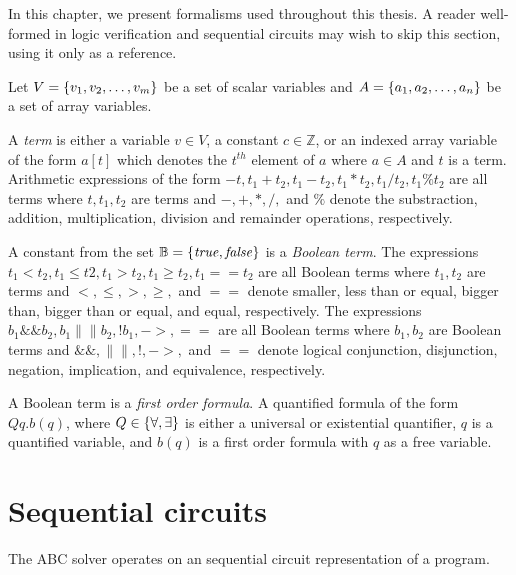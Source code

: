 In this chapter, we present formalisms used throughout this thesis. 
A reader well-formed in logic verification and sequential circuits may
wish to skip this section, using it only as a reference. 

Let $V=\{ v_1,v_2,\ldots,v_m \}$ be a set of scalar 
variables and $A=\{ a_1,a_2,\ldots,a_n \}$ be a set of 
array variables. 
\begin{definition}[terms] \label{def:term}
  \rm A {\em term} is either
  a variable $v\in V$,
 a constant $c\in \mathbb{Z}$, or 
 an indexed array variable of the form $a[t]$ 
 which denotes the $t^{th}$ element of $a$ where $a\in A$ and 
 $t$ is a term.
 Arithmetic expressions of the form 
 $-t, t_1+t_2, t_1-t_2, t_1*t_2, t_1/t_2, t_1\%t_2$ 
 are all terms where $t,t_1,t_2$ are terms and 
 $-,+,*,/,$ and $\%$ denote the substraction, 
 addition, multiplication, division and remainder operations,
 respectively. 
\end{definition}

\begin{definition}
  \rm A constant from the set $\mathbb{B}=\{ \mathit{true}, \mathit{false} \}$
  is a {\em Boolean term}. 
  The expressions 
  $t_1<t_2, t_1\le t2, t_1> t_2, t_1\ge t_2, t_1==t_2$ are
  all Boolean terms where $t_1,t_2$ are terms and $<,\le,>,\ge,$ and $==$ 
  denote smaller, less than or equal, bigger than, 
  bigger than or equal, and equal,
  respectively. 
  The expressions $b_1\&\& b_2, b_1 \|\| b_2, !b_1, ->, ==$ are 
  all Boolean terms where $b_1,b_2$ are Boolean terms and 
  $\&\&, \|\|, !, -> ,$ and $==$ denote logical conjunction, disjunction,
  negation, implication, and equivalence, respectively.
\end{definition}

\begin{definition}
  \rm A Boolean term is a {\em first order formula}. 
  A quantified formula of the form $Q q. b(q)$, where
  $Q\in \{ \forall, \exists \}$ is either a universal
  or existential quantifier, $q$ is a 
  quantified variable, and $b(q)$ is a first order
  formula with $q$ as a free variable. 
\end{definition}

\section{Sequential circuits}
\label{s:back:crct_semantics}
The ABC solver operates on an sequential circuit 
representation of a program.

